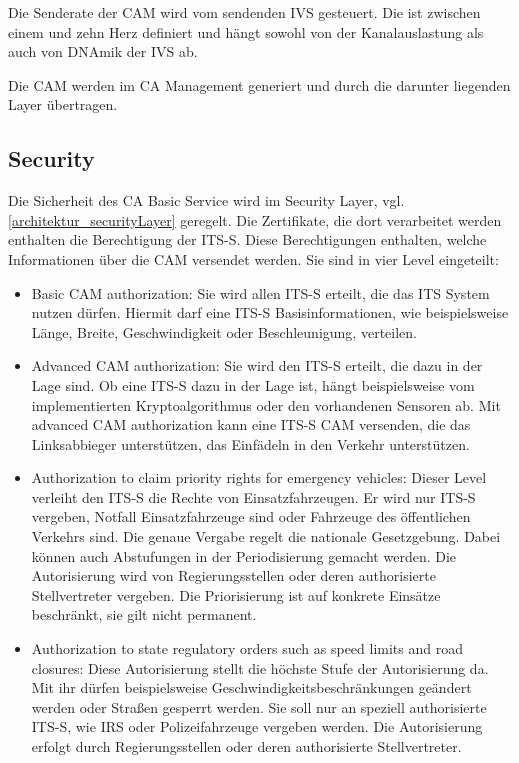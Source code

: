 Die Senderate der \ac{CAM} wird vom sendenden \ac{IVS} gesteuert. Die ist zwischen einem und zehn Herz definiert und hängt sowohl von der Kanalauslastung als auch von DNAmik der \ac{IVS} ab. 

Die \ac{CAM} werden im \ac{CA} Management generiert und durch die darunter liegenden Layer übertragen.

\subsection{Security \label{facilitylayer_CAM-Security}}
Die Sicherheit des \ac{CA} Basic Service wird im Security Layer, vgl. \autoref{architektur_securityLayer} geregelt. Die Zertifikate, die dort verarbeitet werden enthalten die Berechtigung der \ac{ITS-S}. Diese Berechtigungen enthalten, welche Informationen über die \ac{CAM} versendet werden. Sie sind in vier Level eingeteilt:
\begin{itemize}
	\item Basic \ac{CAM} authorization: Sie wird allen \ac{ITS-S} erteilt, die das \ac{ITS} System nutzen dürfen. Hiermit darf eine \ac{ITS-S} Basisinformationen, wie beispielsweise Länge, Breite, Geschwindigkeit oder Beschleunigung, verteilen. 
	\item Advanced \ac{CAM} authorization: Sie wird den \ac{ITS-S} erteilt, die dazu in der Lage sind. Ob eine \ac{ITS-S} dazu in der Lage ist, hängt beispielsweise vom implementierten Kryptoalgorithmus oder den vorhandenen Sensoren ab. Mit advanced \ac{CAM} authorization kann eine \ac{ITS-S} \ac{CAM} versenden, die das Linksabbieger unterstützen, das Einfädeln in den Verkehr unterstützen.
	\item Authorization to claim priority rights for emergency vehicles: Dieser Level verleiht den \ac{ITS-S} die Rechte von Einsatzfahrzeugen. Er wird nur \ac{ITS-S} vergeben, Notfall Einsatzfahrzeuge sind oder Fahrzeuge des öffentlichen Verkehrs sind. Die genaue Vergabe regelt die  nationale Gesetzgebung.  Dabei können auch Abstufungen in der Periodisierung gemacht werden. Die Autorisierung wird von Regierungsstellen oder deren authorisierte Stellvertreter vergeben. Die Priorisierung ist  auf konkrete Einsätze beschränkt, sie gilt nicht permanent.
	\item Authorization to state regulatory orders such as speed limits and road closures: Diese Autorisierung stellt die höchste Stufe der Autorisierung da. Mit ihr dürfen beispielsweise Geschwindigkeitsbeschränkungen geändert werden oder Straßen gesperrt werden. Sie soll nur an speziell authorisierte \ac{ITS-S}, wie \ac{IRS} oder Polizeifahrzeuge vergeben werden. Die Autorisierung erfolgt durch Regierungsstellen oder deren authorisierte Stellvertreter. 
\end{itemize}
 
